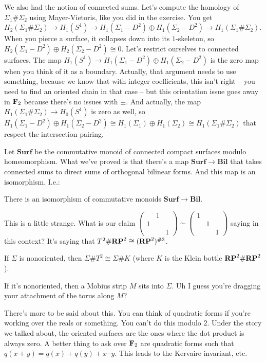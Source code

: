 We also had the notion of connected sums. Let's compute the homology of $\Sigma_1\#\Sigma_2$ using Mayer-Vietoris, like you did in the exercise. You get $ H_2(\Sigma_1\#\Sigma_2)\to H_1(S^1)\to H_1(\Sigma_1-D^2)\oplus H_1(\Sigma_2-D^2)\to H_1(\Sigma_1\#\Sigma_2)$. When you pierce a surface, it collapses down into its $1$-skeleton, so $ H_2(\Sigma_1-D^2)\oplus H_2(\Sigma_2-D^2)\cong 0$. Let's restrict ourselves to connected surfaces. The map $ H_1(S^1)\to H_1(\Sigma_1-D^2)\oplus H_1(\Sigma_2-D^2)$ is the zero map when you think of it as a boundary. Actually, that argument needs to use something, because we know that with integer coefficients, this isn't right -- you need to find an oriented chain in that case -- but this orientation issue goes away in $\mathbf F_2$ because there's no issues with $\pm$. And actually, the map $ H_1(\Sigma_1\#\Sigma_2)\to H_0(S^1)$ is zero as well, so $ H_1(\Sigma_1-D^2)\oplus H_1(\Sigma_2-D^2)\cong H_1(\Sigma_1)\oplus H_1(\Sigma_2)\cong H_1(\Sigma_1\#\Sigma_2)$ that respect the intersection pairing.

Let $\mathbf{Surf}$ be the commutative monoid of connected compact surfaces modulo homeomorphism. What we've proved is that there's a map $\mathbf{Surf}\to\mathbf{Bil}$ that takes connected sums to direct sums of orthogonal bilinear forms. And this map is an isomorphism. I.e.:
\begin{theorem}
There is an isomorphism of commutative monoids $\mathbf{Surf}\to\mathbf{Bil}$.
\end{theorem}
This is a little strange. What is our claim $\begin{pmatrix}
 & 1 & \\
1 & & \\
 & & 1
\end{pmatrix}
\sim
\begin{pmatrix}
1 & & \\
& 1 & \\
& & 1
\end{pmatrix}$ saying in this context? It's saying that $T^2\#\mathbf{RP}^2\cong(\mathbf{RP}^2)^{\# 3}$.
\begin{claim}
If $\Sigma$ is nonoriented, then $\Sigma\# T^2\cong\Sigma\# K$ (where $K$ is the Klein bottle $\mathbf{RP}^2\#\mathbf{RP}^2$).
\end{claim}
If it's nonoriented, then a Mobius strip $M$ sits into $\Sigma$. Uh I guess you're dragging your attachment of the torus along $M$?

There's more to be said about this. You can think of quadratic forms if you're working over the reals or something. You can't do this modulo $2$. Under the story we talked about, the oriented surfaces are the ones where the dot product is always zero. A better thing to ask over $\mathbf F_2$ are quadratic forms such that $q(x+y)=q(x)+q(y)+x\cdot y$. This leads to the Kervaire invariant, etc.

